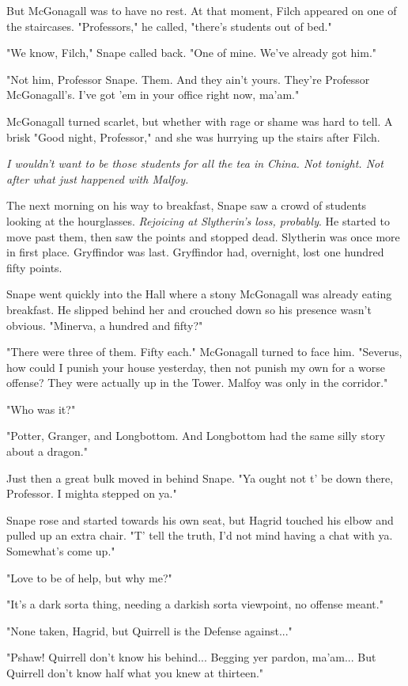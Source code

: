 But McGonagall was to have no rest. At that moment, Filch appeared on one of the staircases. "Professors," he called, "there's students out of bed."

"We know, Filch," Snape called back. "One of mine. We've already got him."

"Not him, Professor Snape. Them. And they ain't yours. They're Professor McGonagall's. I've got 'em in your office right now, ma'am."

McGonagall turned scarlet, but whether with rage or shame was hard to tell. A brisk "Good night, Professor," and she was hurrying up the stairs after Filch.

\emph{I wouldn't want to be those students for all the tea in China. Not tonight. Not after what just happened with Malfoy.}

The next morning on his way to breakfast, Snape saw a crowd of students looking at the hourglasses. \emph{Rejoicing at Slytherin's loss, probably}. He started to move past them, then saw the points and stopped dead. Slytherin was once more in first place. Gryffindor was last. Gryffindor had, overnight, lost one hundred fifty points.

Snape went quickly into the Hall where a stony McGonagall was already eating breakfast. He slipped behind her and crouched down so his presence wasn't obvious. "Minerva, a hundred and fifty?"

"There were three of them. Fifty each." McGonagall turned to face him. "Severus, how could I punish your house yesterday, then not punish my own for a worse offense? They were actually up in the Tower. Malfoy was only in the corridor."

"Who was it?"

"Potter, Granger, and Longbottom. And Longbottom had the same silly story about a dragon."

Just then a great bulk moved in behind Snape. "Ya ought not t' be down there, Professor. I mighta stepped on ya."

Snape rose and started towards his own seat, but Hagrid touched his elbow and pulled up an extra chair. "T' tell the truth, I'd not mind having a chat with ya. Somewhat's come up."

"Love to be of help, but why me?"

"It's a dark sorta thing, needing a darkish sorta viewpoint, no offense meant."

"None taken, Hagrid, but Quirrell is the Defense against..."

"Pshaw! Quirrell don't know his behind... Begging yer pardon, ma'am... But Quirrell don't know half what you knew at thirteen."

